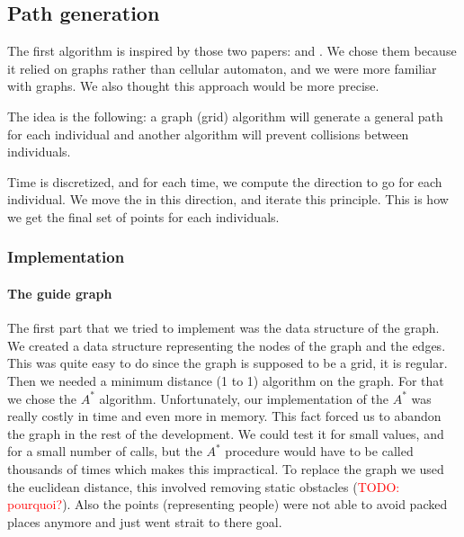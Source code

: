 \subsection{Path generation}

The first algorithm is inspired by those two papers: \cite{PLE} and
\cite{vandenBerg2011}. We chose them because it relied on graphs
rather than cellular automaton, and we were more familiar with
graphs. We also thought this approach would be more precise.


The idea is the following: a graph (grid) algorithm will generate a
general path for each individual and another algorithm will prevent
collisions between individuals.


Time is discretized, and for each time, we compute the direction to go
for each individual. We move the in this direction, and iterate this
principle. This is how we get the final set of points for each
individuals.


\subsubsection{Implementation}


\paragraph{The guide graph}

The first part that we tried to implement was the data structure of
the graph. We created a data structure representing the nodes of the
graph and the edges. This was quite easy to do since the graph is
supposed to be a grid, it is regular.  Then we needed a minimum
distance (1 to 1) algorithm on the graph. For that we chose the $A^*$
algorithm. Unfortunately, our implementation of the $A^*$ was really
costly in time and even more in memory. This fact forced us to abandon
the graph in the rest of the development. We could test it for small
values, and for a small number of calls, but the $A^*$ procedure would
have to be called thousands of times which makes this impractical.  To
replace the graph we used the euclidean distance, this involved
removing static obstacles (\textcolor{red}{TODO: pourquoi?}). Also the
points (representing people) were not  able to avoid packed places
anymore and just went strait to there goal.

